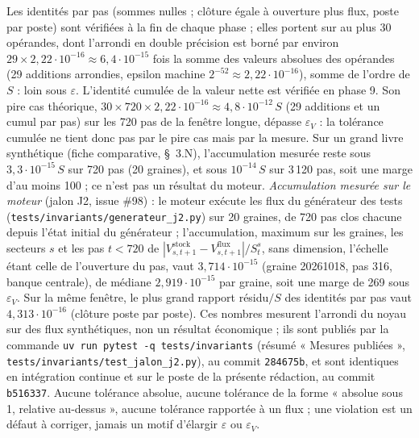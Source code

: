 \documentclass[11pt,a4paper]{article}
\begin{document}
Les identités par pas (sommes nulles ; clôture égale à ouverture plus flux, poste par poste) sont vérifiées à la fin de chaque phase ; elles portent sur au plus 30 opérandes, dont l'arrondi en double précision est borné par environ $29 \times 2{,}22 \cdot 10^{-16} \approx 6{,}4 \cdot 10^{-15}$ fois la somme des valeurs absolues des opérandes (29 additions arrondies, epsilon machine $2^{-52} \approx 2{,}22 \cdot 10^{-16}$), somme de l'ordre de $S$ : loin sous $\varepsilon$. L'identité cumulée de la valeur nette est vérifiée en phase 9. Son pire cas théorique, $30 \times 720 \times 2{,}22 \cdot 10^{-16} \approx 4{,}8 \cdot 10^{-12}\,S$ (29 additions et un cumul par pas) sur les 720 pas de la fenêtre longue, dépasse $\varepsilon_V$ : la tolérance cumulée ne tient donc pas par le pire cas mais par la mesure. Sur un grand livre synthétique (fiche comparative, \S~3.N), l'accumulation mesurée reste sous $3{,}3 \cdot 10^{-15}\,S$ sur 720 pas (20 graines), et sous $10^{-14}\,S$ sur 3\,120 pas, soit une marge d'au moins 100 ; ce n'est pas un résultat du moteur. \emph{Accumulation mesurée sur le moteur} (jalon J2, issue \#98) : le moteur exécute les flux du générateur des tests (\nolinkurl{tests/invariants/generateur_j2.py}) sur 20 graines, de 720 pas clos chacune depuis l'état initial du générateur ; l'accumulation, maximum sur les graines, les secteurs $s$ et les pas $t < 720$ de $|V^{\mathrm{stock}}_{s,t+1} - V^{\mathrm{flux}}_{s,t+1}|/S^s_t$, sans dimension, l'échelle étant celle de l'ouverture du pas, vaut $3{,}714 \cdot 10^{-15}$ (graine 20261018, pas 316, banque centrale), de médiane $2{,}919 \cdot 10^{-15}$ par graine, soit une marge de 269 sous $\varepsilon_V$. Sur la même fenêtre, le plus grand rapport résidu$/S$ des identités par pas vaut $4{,}313 \cdot 10^{-16}$ (clôture poste par poste). Ces nombres mesurent l'arrondi du noyau sur des flux synthétiques, non un résultat économique ; ils sont publiés par la commande \texttt{uv run pytest -q tests/invariants} (résumé « Mesures publiées », \nolinkurl{tests/invariants/test_jalon_j2.py}), au commit \texttt{284675b}, et sont identiques en intégration continue et sur le poste de la présente rédaction, au commit \texttt{b516337}. Aucune tolérance absolue, aucune tolérance de la forme « absolue sous 1, relative au-dessus », aucune tolérance rapportée à un flux ; une violation est un défaut à corriger, jamais un motif d'élargir $\varepsilon$ ou $\varepsilon_V$.
\end{document}
